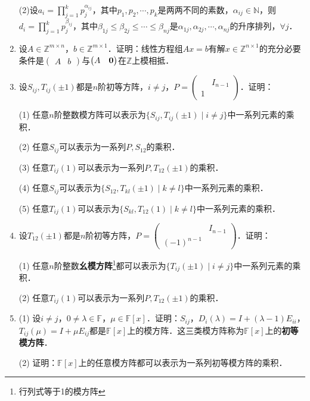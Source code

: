 \documentclass[a4paper,fontset=windows]{ctexbook}
\theoremstyle{definition}
\renewcommand{\le}{\leqslant}
\begin{document}
\begin{enumerate}
(2)设$a_i=\prod\limits_{j=1}^kp_j^{\alpha_{ij}}$，其中$p_1,p_2,\cdots,p_k$是两两不同的素数，$\alpha_{ij}\in\mathbb{N}$，则$d_i=\prod\limits_{j=1}^kp_j^{\beta_{ij}}$，其中$\beta_{1j}\le\beta_{2j}\le\cdots\le\beta_{nj}$是$\alpha_{1j},\alpha_{2j},\cdots,\alpha_{nj}$的升序排列，$\forall j$．

\item 设$A\in\mathbb{Z}^{m\times n}$，$b\in\mathbb{Z}^{m\times 1}$．证明：线性方程组$Ax=b$有解$x\in\mathbb{Z}^{n\times 1}$的充分必要条件是$\begin{pmatrix}A&b\end{pmatrix}$与$\begin{pmatrix}A&{\bf 0}\end{pmatrix}$在$\mathbb{Z}$上模相抵．

\item 设$S_{ij},T_{ij}(\pm 1)$都是$n$阶初等方阵，$i\ne j$，$P=\begin{pmatrix}&I_{n-1} \\ 1&\end{pmatrix}$．证明：

(1) 任意$n$阶整数模方阵可以表示为$\{S_{ij},T_{ij}(\pm 1)\mid i\ne j\}$中一系列元素的乘积．

(2) 任意$S_{ij}$可以表示为一系列$P,S_{12}$的乘积．

(3) 任意$T_{ij}(1)$可以表示为一系列$P,T_{12}(\pm 1)$的乘积．

(4) 任意$S_{ij}$可以表示为$\{S_{12},T_{kl}(\pm 1)\mid k\ne l\}$中一系列元素的乘积．

(5) 任意$T_{ij}(1)$可以表示为$\{S_{kl},T_{12}(1)\mid k\ne l\}$中一系列元素的乘积．

\item 设$T_{12}(\pm 1)$都是$n$阶初等方阵，$P=\begin{pmatrix}&I_{n-1} \\ (-1)^{n-1}&\end{pmatrix}$．证明：

(1) 任意$n$阶整数{\bf 幺模方阵}\footnote{行列式等于1的模方阵}都可以表示为$\{T_{ij}(\pm 1)\mid i\ne j\}$中一系列元素的乘积．

(2) 任意$T_{ij}(1)$可以表示为一系列$P,T_{12}(\pm 1)$的乘积．

\item (1) 设$i\ne j$，$0\ne\lambda\in\mathbb{F}$，$\mu\in\mathbb{F}[x]$．证明：$S_{ij}$，$D_i(\lambda)=I+(\lambda-1)E_{ii}$，$T_{ij}(\mu)=I+\mu E_{ij}$都是$\mathbb{F}[x]$上的模方阵．这三类模方阵称为$\mathbb{F}[x]$上的{\bf 初等模方阵}．

(2) 证明：$\mathbb{F}[x]$上的任意模方阵都可以表示为一系列初等模方阵的乘积．


\end{enumerate}
\end{document}
